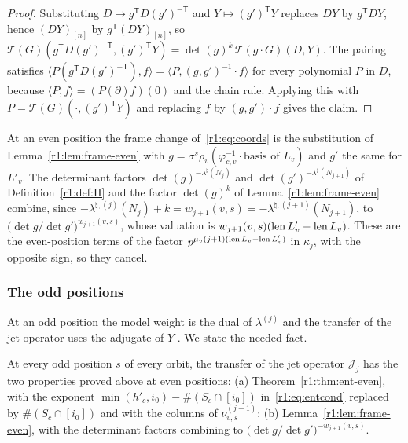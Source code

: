 \begin{proof}
Substituting $D\mapsto g^{\mathsf T}D(g')^{-\mathsf T}$ and $Y\mapsto(g')^{\mathsf T}Y$ replaces $DY$ by $g^{\mathsf T}DY$, hence $(DY)_{[n]}$ by $g^{\mathsf T}(DY)_{[n]}$, so $\mathcal T(G)(g^{\mathsf T}D(g')^{-\mathsf T},(g')^{\mathsf T}Y)=\det(g)^k\,\mathcal T(g\cdot G)(D,Y)$. The pairing satisfies $\langle P(g^{\mathsf T}D(g')^{-\mathsf T}),f\rangle=\langle P,(g,g')^{-1}\cdot f\rangle$ for every polynomial $P$ in $D$, because $\langle P,f\rangle=(P(\partial)f)(0)$ and the chain rule. Applying this with $P=\mathcal T(G)(\cdot,(g')^{\mathsf T}Y)$ and replacing $f$ by $(g,g')\cdot f$ gives the claim.
\end{proof}

At an even position the frame change of~\eqref{r1:eq:coords} is the substitution of Lemma~\ref{r1:lem:frame-even} with $g=\sigma^s\rho_v(\varphi_{c,v}^{-1}\cdot\text{basis of }L_v)$ and $g'$ the same for $L'_v$. The determinant factors $\det(g)^{-\lambda^\natural(N_j)}$ and $\det(g')^{-\lambda^{\natural}(N_{j+1})}$ of Definition~\ref{r1:def:H} and the factor $\det(g)^k$ of Lemma~\ref{r1:lem:frame-even} combine, since $-\lambda^{\natural,(j)}(N_j)+k=w_{j+1}(v,s)=-\lambda^{\natural,(j+1)}(N_{j+1})$, to $\big(\det g/\det g'\big)^{w_{j+1}(v,s)}$, whose valuation is $w_{j+1}(v,s)(\operatorname{len} L'_v-\operatorname{len} L_v)$. These are the even-position terms of the factor $p^{\mu_v(j+1)(\operatorname{len} L_v-\operatorname{len} L'_v)}$ in $\kappa_j$, with the opposite sign, so they cancel.

\subsubsection{The odd positions}

At an odd position the model weight is the dual of $\lambda^{(j)}$ and the transfer of the jet operator uses the adjugate of $Y$ . We state the needed fact.

\begin{hypothesis}[(N2)]\label{r1:hyp:H2}
At every odd position $s$ of every orbit, the transfer of the jet operator $\mathcal J_j$ has the two properties proved above at even positions: (a) Theorem~\ref{r1:thm:ent-even}, with the exponent $\min(h'_c,i_0)-\#(S_c\cap[i_0])$ in~\eqref{r1:eq:entcond} replaced by $\#(S_c\cap[i_0])$ and with the columns of $\nu^{(j+1)}_{v,s}$; (b) Lemma~\ref{r1:lem:frame-even}, with the determinant factors combining to $\big(\det g/\det g'\big)^{-w_{j+1}(v,s)}$.
\end{hypothesis}

